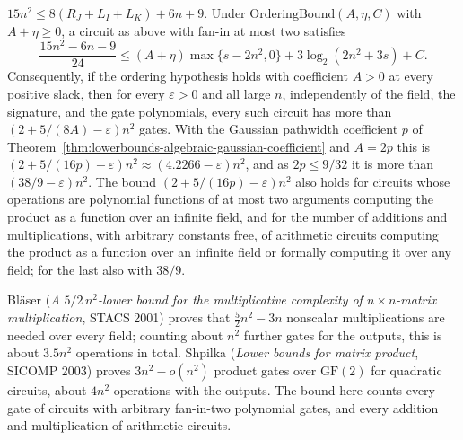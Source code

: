 \begin{theorem}
  $15n^2\le8(R_J+L_I+L_K)+6n+9$. Under $\mathrm{OrderingBound}(A,\eta,C)$
  with $A+\eta\ge0$, a circuit as above with fan-in at most two satisfies
  \[
    \frac{15n^2-6n-9}{24} \le (A+\eta)\max\{s-2n^2,0\} + 3\log_2(2n^2+3s) + C .
  \]
  Consequently, if the ordering hypothesis holds with coefficient $A>0$ at
  every positive slack, then for every $\varepsilon>0$ and all large $n$,
  independently of the field, the signature, and the gate polynomials, every
  such circuit has more than $(2+5/(8A)-\varepsilon)n^2$ gates. With the
  Gaussian pathwidth coefficient $p$ of
  Theorem~\ref{thm:lowerbounds-algebraic-gaussian-coefficient} and $A=2p$
  this is $(2+5/(16p)-\varepsilon)n^2\approx(4.2266-\varepsilon)n^2$, and as
  $2p\le9/32$ it is more than $(38/9-\varepsilon)n^2$. The bound
  $(2+5/(16p)-\varepsilon)n^2$ also holds for circuits whose operations are
  polynomial functions of at most two arguments computing the product as a
  function over an infinite field, and for the number of additions and
  multiplications, with arbitrary constants free, of arithmetic circuits
  computing the product as a function over an infinite field or formally
  computing it over any field; for the last also with $38/9$.

  Bläser (\emph{A $5/2\,n^2$-lower bound for the multiplicative complexity of
  $n\times n$-matrix multiplication}, STACS 2001) proves that
  $\tfrac52n^2-3n$ nonscalar multiplications are needed over every field;
  counting about $n^2$ further gates for the outputs, this is about $3.5n^2$
  operations in total. Shpilka (\emph{Lower bounds for matrix product},
  SICOMP 2003) proves $3n^2-o(n^2)$ product gates over $\mathrm{GF}(2)$ for
  quadratic circuits, about $4n^2$ operations with the outputs. The bound
  here counts every gate of circuits with arbitrary fan-in-two polynomial
  gates, and every addition and multiplication of arithmetic circuits.
\end{theorem}
